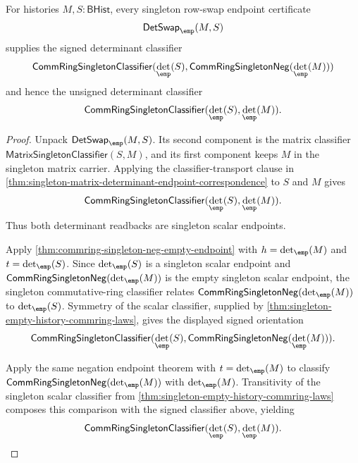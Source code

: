 \begin{theorem}
\label{thm:determinant-singleton-row-swap-sign-collapse}
For histories $M,S:\mathsf{BHist}$, every singleton row-swap endpoint
certificate
$$
\mathsf{DetSwap}_{\emp}(M,S)
$$
supplies the signed determinant classifier
$$
\mathsf{CommRingSingletonClassifier}
(\det_{\emp}(S),\mathsf{CommRingSingletonNeg}(\det_{\emp}(M)))
$$
and hence the unsigned determinant classifier
$$
\mathsf{CommRingSingletonClassifier}(\det_{\emp}(S),\det_{\emp}(M)).
$$
\end{theorem}
\begin{proof}
Unpack $\mathsf{DetSwap}_{\emp}(M,S)$. Its second component is the matrix
classifier $\mathsf{MatrixSingletonClassifier}(S,M)$, and its first component
keeps $M$ in the singleton matrix carrier. Applying the classifier-transport
clause in \autoref{thm:singleton-matrix-determinant-endpoint-correspondence}
to $S$ and $M$ gives
$$
\mathsf{CommRingSingletonClassifier}(\det_{\emp}(S),\det_{\emp}(M)).
$$
Thus both determinant readbacks are singleton scalar endpoints.

Apply \autoref{thm:commring-singleton-neg-empty-endpoint} with
$h=\det_{\emp}(M)$ and $t=\det_{\emp}(S)$. Since $\det_{\emp}(S)$ is a
singleton scalar endpoint and $\mathsf{CommRingSingletonNeg}(\det_{\emp}(M))$
is the empty singleton scalar endpoint, the singleton commutative-ring
classifier relates $\mathsf{CommRingSingletonNeg}(\det_{\emp}(M))$ to
$\det_{\emp}(S)$. Symmetry of the scalar classifier, supplied by
\autoref{thm:singleton-empty-history-commring-laws}, gives the displayed
signed orientation
$$
\mathsf{CommRingSingletonClassifier}
(\det_{\emp}(S),\mathsf{CommRingSingletonNeg}(\det_{\emp}(M))).
$$

Apply the same negation endpoint theorem with $t=\det_{\emp}(M)$ to classify
$\mathsf{CommRingSingletonNeg}(\det_{\emp}(M))$ with $\det_{\emp}(M)$.
Transitivity of the singleton scalar classifier from
\autoref{thm:singleton-empty-history-commring-laws} composes this comparison
with the signed classifier above, yielding
$$
\mathsf{CommRingSingletonClassifier}(\det_{\emp}(S),\det_{\emp}(M)).
$$
\end{proof}
